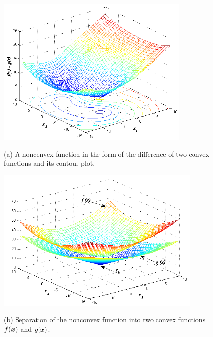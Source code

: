 \begin{figure}%
\centering
  \includegraphics[width=0.85\textwidth,height=0.45\textheight]{figures/ccp/ccp_a}
   
  (a) A nonconvex function in the form of the difference of two convex functions and its contour plot.
  
  \includegraphics[width=0.9\textwidth,height=0.45\textheight]{figures/ccp/ccp_b}
  
  (b) Separation of the nonconvex function into two convex functions $f(\protect\mbox{\boldmath$x$})$ and $g(\protect\mbox{\boldmath$x$})$.
\end{figure} \label{fig:ExampleCCP}
